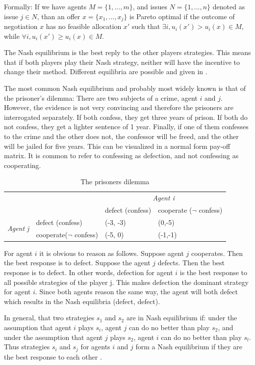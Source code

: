 Formally: If we have agents $M = \{1,...,m\}$, and issues $N = \{1,...,n\}$ denoted as issue $j\in N$, than an offer $x = \{x_1, ..., x_j\}$ is Pareto optimal if the outcome of negotiation $x$ has no feasible allocation $x'$ such that $ \exists i, u_i(x')> u_i(x) \in M$, while $\forall i, u_i(x')\geq u_i(x)  \in M$. 

The Nash equilibrium is the best reply to the other players strategies. This means that if both players play their Nash strategy, neither will have the incentive to change their method. Different equilibria are possible and given in \citep{trappey2013multi}. 

The most common Nash equilibrium and probably most widely known is that of the prisoner's dilemma:
There are two subjects of a crime, agent $i$ and $j$. However, the evidence is not very convincing and therefore the prisoners are interrogated separately. If both confess, they get three years of prison. If both do not confess, they get a lighter sentence of 1 year. Finally, if one of them confesses to the crime and the other does not, the confessor will be freed, and the other will be jailed for five years.
This can be visualized in a normal form pay-off matrix. It is common to refer to confessing as defection, and not confessing as cooperating.
\begin{table}[h]
\begin{tabular}{llll}
	\toprule 
		&  				& \multicolumn{2}{c}{\textit{Agent i}}\\ 
		\cmidrule{3-4}
	 	&				& defect (confess) 	& cooperate ($\neg$ confess) \\ 
	 	\cmidrule{3-4}
	\multirow{2}{*}{\textit{Agent j}}	& defect (confess)	&  	(-3, -3)			& (0,-5) \\ 
		& cooperate($\neg $ confess) 	&  (-5, 0)				& (-1,-1) \\ 
	\bottomrule
\end{tabular} \label{tab:nashprison} \caption{The prisoners dilemma}
\end{table}
For agent $i$ it is obvious to reason as follows. Suppose agent $j$ cooperates. Then the best response is to defect. Suppose the agent $j$ defects. Then the best response is to defect. In other words, defection for agent $i$ is the best response to all possible strategies of the player j. This makes defection the dominant strategy for agent $i$. Since both agents reason the same way, the agent will both defect which results in the Nash equilibria (defect, defect).

In general, that two strategies $s_1$ and $s_2$ are in Nash equilibrium if: under the assumption that agent $i$ plays $s_i$, agent $j$ can do no better than play $s_2$, and under the assumption that agent $j$ plays $s_2$, agent $i$ can do no better than play $s_l$. Thus strategies $s_i$ and $s_j$ for agents $i$ and $j$ form a Nash equilibrium if they are the best response to each other  \citep{wooldridge2009introduction}. 

